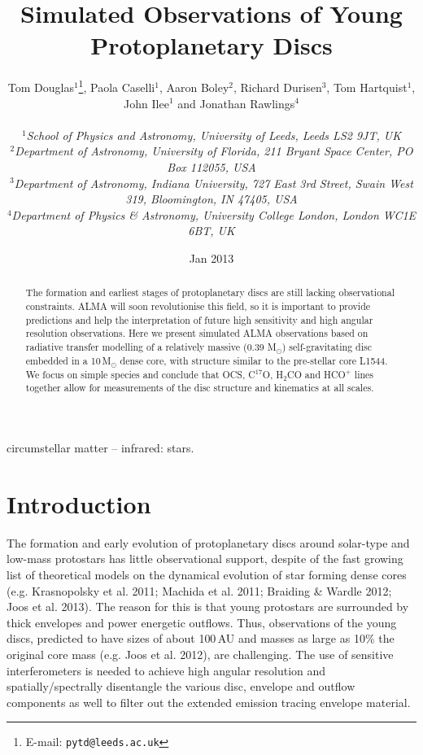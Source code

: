 \documentclass[useAMS,usenatbib]{mn2e}
\title[Young protoplanetary discs]{Simulated Observations of Young Protoplanetary Discs}
\author[T.~A.~Douglas et al.]
{\parbox{\textwidth}{Tom Douglas$^{1}$\thanks{E-mail: \texttt{pytd@leeds.ac.uk}},
Paola Caselli$^{1}$,
Aaron Boley$^{2}$,
Richard Durisen$^{3}$,
Tom Hartquist$^{1}$,
John Ilee$^{1}$ and
Jonathan Rawlings$^{4}$\\
\vspace{0.1cm}\\
{\small{\it$^{1}$School of Physics and Astronomy, University of Leeds, Leeds LS2 9JT, UK}} \\
{\small{\it$^{2}$Department of Astronomy, University of Florida, 211 Bryant Space Center, PO Box 112055, USA}}\\
{\small{\it$^{3}$Department of Astronomy, Indiana University, 727 East 3rd Street, Swain West 319, Bloomington, IN 47405, USA}}\\
{\small{\it$^{4}$Department of Physics \& Astronomy, University College London, London WC1E 6BT, UK}}\\}}
\begin{document}
\date{Jan 2013}

\pagerange{\pageref{firstpage}--\pageref{lastpage}} 

\maketitle

\label{firstpage}

\begin{abstract}
The formation and earliest stages of protoplanetary discs are still lacking observational constraints. ALMA will soon revolutionise this field, so it is important to provide predictions and help the interpretation of future high sensitivity and high angular resolution observations. Here we present simulated ALMA observations based on radiative transfer modelling of a relatively massive (0.39 M$_{\odot}$) self-gravitating disc embedded in a 10\,M$_{\odot}$ dense core, with structure similar to the pre-stellar core L1544. We focus on simple species and conclude that OCS, C$^{17}$O, H$_2$CO and HCO$^+$ lines together allow for measurements of the disc structure and kinematics at all scales. 
\end{abstract}

\begin{keywords}
circumstellar matter -- infrared: stars.
\end{keywords}

\section{Introduction}

The formation and early evolution of protoplanetary discs around solar-type and low-mass protostars has little observational support, despite of the fast growing list of theoretical models on the dynamical evolution of star forming dense cores (e.g. Krasnopolsky et al. 2011; Machida et al. 2011; Braiding \& Wardle 2012; Joos et al. 2013). The reason for this is that young protostars are surrounded by thick envelopes and power energetic outflows. Thus, observations of the young discs, predicted to have sizes of about 100\,AU and masses as large as 10\% the original core mass (e.g. Joos et al. 2012), are challenging. The use of sensitive interferometers is needed to achieve high angular resolution and spatially/spectrally disentangle the various disc, envelope and outflow components as well to filter out the extended emission tracing envelope material. \newline
\end{document}
